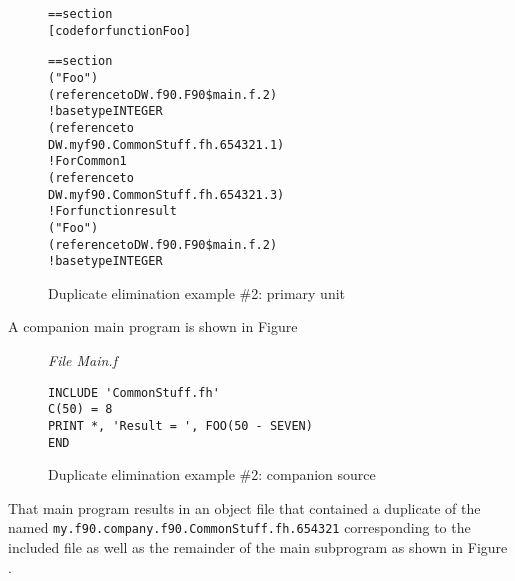 \begin{figure}
\begin{dwflisting}
\begin{alltt}
== section \dottext{}
    [code for function Foo]

== section \dotdebuginfo{}
    \DWTAGcompileunit
        \DWTAGsubprogram
            \DWATname("Foo")
            \DWATtype(reference to DW.f90.F90\$main.f.2)
                ! base type INTEGER
            \DWTAGimportedunit
                \DWATimport(reference to
                    DW.myf90.CommonStuff.fh.654321.1)
            \DWTAGcommoninclusion ! For Common1
                \DWATcommonreference(reference to
                    DW.myf90.CommonStuff.fh.654321.3)
            \DWTAGvariable ! For function result
                \DWATname("Foo")
                    \DWATtype(reference to DW.f90.F90\$main.f.2)
                        ! base type INTEGER
\end{alltt}
\end{dwflisting}
\caption{Duplicate elimination example \#2: primary unit}
\label{fig:duplicateeliminationexample2primaryunit}
\end{figure}

A companion main program is shown in 
Figure 

\begin{figure}
\textit{File Main.f} 
\begin{lstlisting}[numbers=none]
INCLUDE 'CommonStuff.fh'
C(50) = 8
PRINT *, 'Result = ', FOO(50 - SEVEN)
END
\end{lstlisting}
\caption{Duplicate elimination example \#2: companion source }
\label{fig:duplicateeliminationexample2companionsource}
\end{figure}

That main program results in an object file that
contained a duplicate of the  named
\texttt{my.f90.company.f90.CommonStuff.fh.654321} 
corresponding to the
included file as well as the remainder of the main subprogram
as shown in 
Figure .

